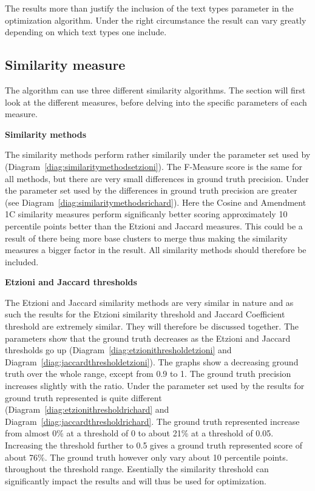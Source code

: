 The results more than justify the inclusion of the text types parameter in the optimization algorithm. Under the right circumstance the result can vary greatly depending on which text types one include.

\subsection{Similarity measure}

The \CTC algorithm can use three different similarity algorithms. The section will first look at the different measures, before delving into the specific parameters of each measure.

\textbf{Similarity methods}

The similarity methods perform rather similarily under the parameter set used by \citeauthor{Oren1998} (Diagram~\ref{diag:similaritymethodsetzioni}). The F-Measure score is the same for all methods, but there are very small differences in ground truth precision. Under the parameter set used by \supervisor the differences in ground truth precision are greater (see Diagram~\ref{diag:similaritymethodsrichard}). Here the Cosine and Amendment 1C similarity measures perform significanly better scoring approximately 10 percentile points better than the Etzioni and Jaccard measures. This could be a result of there being more base clusters to merge thus making the similarity measures a bigger factor in the result. All similarity methods should therefore be included.

\textbf{Etzioni and Jaccard thresholds}

The Etzioni and Jaccard similarity methods are very similar in nature and as such the results for the Etzioni similarity threshold and Jaccard Coefficient threshold are extremely similar. They will therefore be discussed together. The \citeauthor{Oren1998} parameters show that the ground truth decreases as the Etzioni and Jaccard thresholds go up (Diagram~\ref{diag:etzionithresholdetzioni} and Diagram~\ref{diag:jaccardthresholdetzioni}). The graphs show a decreasing ground truth over the whole range, except from 0.9 to 1. The ground truth precision increases slightly with the ratio. Under the parameter set used by \supervisor the results for ground truth represented is quite different (Diagram~\ref{diag:etzionithresholdrichard} and Diagram~\ref{diag:jaccardthresholdrichard}. The ground truth represented increase from almost 0\% at a threshold of 0 to about 21\% at a threshold of 0.05. Increasing the threshold further to 0.5 gives a ground truth represented score of about 76\%. The ground truth however only vary about 10 percentile points. throughout the threshold range. Esentially the similarity threshold can significantly impact the results and will thus be used for optimization.


